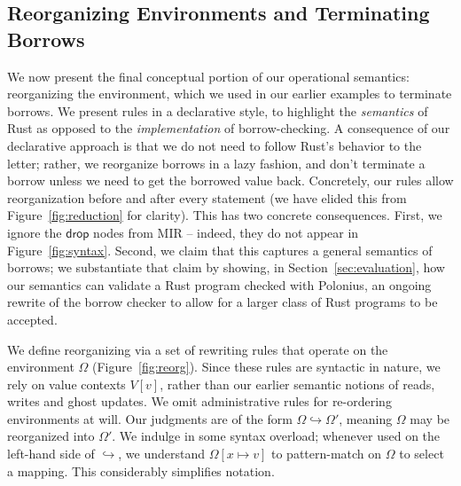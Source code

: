 \documentclass[acmsmall,screen]{acmart}
\newcommand{\sref}[1]{Section~\ref{sec:#1}}
\newcommand{\fref}[1]{Figure~\ref{fig:#1}}
\newcommand\kw[1]{\ensuremath{\mathsf{#1}}}
\begin{document}
\subsection{Reorganizing Environments and Terminating Borrows}
\label{sec:semantics-reorganize}

We now present the final conceptual portion
of our operational semantics: reorganizing the
environment, which we used in our earlier examples to terminate borrows. We present rules in a
declarative style, to highlight the \emph{semantics} of Rust as opposed to the
\emph{implementation} of borrow-checking. A consequence of our declarative
approach is that we do not need to follow Rust's behavior to the letter; rather,
we reorganize borrows in a lazy fashion, and don't terminate a borrow unless we
need to get the borrowed value back. Concretely, our rules allow reorganization before
and after every statement (we have elided this from \fref{reduction} for
clarity). This has two concrete consequences. First,
we ignore the $\kw{drop}$ nodes from MIR -- indeed, they do not appear in
\fref{syntax}. Second, we claim that this captures a general semantics of
borrows; we substantiate that claim by showing, in \sref{evaluation}, how our
semantics can validate a Rust program checked with Polonius, an ongoing rewrite
of the borrow checker to allow for a larger class of Rust programs to be
accepted.


We define reorganizing via a set of rewriting rules that operate on the
environment $\Omega$ (\fref{reorg}). Since these rules are syntactic in nature, we rely on
value contexts $V[v]$, rather than our earlier semantic notions of
reads, writes and ghost updates. We omit administrative rules for
re-ordering environments at will. Our judgments are of the form $\Omega \hookrightarrow
\Omega'$, meaning $\Omega$ may be reorganized into $\Omega'$. We indulge in some
syntax overload; whenever used on the left-hand side of $\hookrightarrow$, we
understand $\Omega[x \mapsto v]$ to pattern-match on $\Omega$ to select a
mapping. This considerably simplifies notation.
\end{document}
